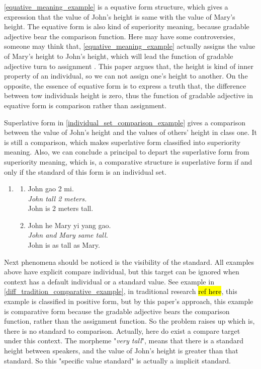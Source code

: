 \documentclass{ctexart}
\let \cite \parencite
\begin{document}
\ref{equative_meaning_example} is a equative form structure, which gives a expression that the value of John's height is same with the value of Mary's height. The equative form is also kind of superiority meaning, because gradable adjective bear the comparison function. Here may have some controversies, someone may think that, \ref{equative_meaning_example} actually assigns the value of Mary's height to John's height, which will lead the function of gradable adjective turn to assignment \cite{guo2012}. This paper argues that, the height is kind of inner property of an individual, so we can not assign one's height to another. On the opposite, the essence of equative form is to express a truth that, the difference between tow individuals height is zero, thus the function of gradable adjective in equative form is comparison rather than assignment.

Superlative form in \ref{individual_set_comparison_example} gives a comparison between the value of John's height and the values of others' height in class one. It is still a comparison, which makes superlative form classified into superiority meaning. Also, we can conclude a principal to depart the superlative form from superiority meaning, which is, a comparative structure is superlative form if and only if the standard of this form is an individual set.

\begin{enumerate}[resume]
    \item
    \begin{enumerate}[ref=(\arabic{enumi}\alph*)]
        \item \label{positive_meaning_example}
        John gao 2 mi.\\
        \textit{John tall 2 meters.} \\
        John is 2 meters tall.

        \item \label{equative_meaning_example}
        John he Mary yi yang gao.\\
        \textit{John and Mary same tall.}\\
        John is as tall as Mary.

    \end{enumerate}
\end{enumerate}

Next phenomena should be noticed is the visibility of the standard. All examples above have explicit compare individual, but this target can be ignored when context has a default individual or a standard value. See example in \ref{diff_tradition_comparative_example}, in traditional research \hl{ref here}, this example is classified in positive form, but by this paper's approach, this example is comparative form because the gradable adjective bears the comparison function, rather than the assignment function. So the problem raises up which is, there is no standard to comparison. Actually, here do exist a compare target under this context. The morpheme "\textit{very tall}", means that there is a standard height between speakers, and the value of John's height is greater than that standard. So this "specific value standard" is actually a implicit standard.
\end{document}
